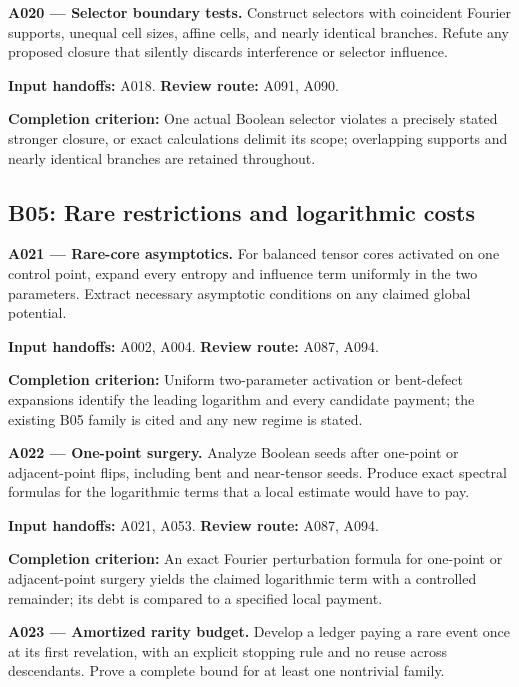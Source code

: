 \documentclass[11pt]{article}
\begin{document}
\textbf{A020 --- Selector boundary tests.} Construct selectors with coincident Fourier supports, unequal cell sizes, affine cells, and nearly identical branches. Refute any proposed closure that silently discards interference or selector influence.

{\small\color{ink}\textbf{Input handoffs:} A018. \textbf{Review route:} A091, A090.\par
\textbf{Completion criterion:} One actual Boolean selector violates a precisely stated stronger closure, or exact calculations delimit its scope; overlapping supports and nearly identical branches are retained throughout.\par}



\subsection{B05: Rare restrictions and logarithmic costs}

\textbf{A021 --- Rare-core asymptotics.} For balanced tensor cores activated on one control point, expand every entropy and influence term uniformly in the two parameters. Extract necessary asymptotic conditions on any claimed global potential.

{\small\color{ink}\textbf{Input handoffs:} A002, A004. \textbf{Review route:} A087, A094.\par
\textbf{Completion criterion:} Uniform two-parameter activation or bent-defect expansions identify the leading logarithm and every candidate payment; the existing B05 family is cited and any new regime is stated.\par}



\textbf{A022 --- One-point surgery.} Analyze Boolean seeds after one-point or adjacent-point flips, including bent and near-tensor seeds. Produce exact spectral formulas for the logarithmic terms that a local estimate would have to pay.

{\small\color{ink}\textbf{Input handoffs:} A021, A053. \textbf{Review route:} A087, A094.\par
\textbf{Completion criterion:} An exact Fourier perturbation formula for one-point or adjacent-point surgery yields the claimed logarithmic term with a controlled remainder; its debt is compared to a specified local payment.\par}



\textbf{A023 --- Amortized rarity budget.} Develop a ledger paying a rare event once at its first revelation, with an explicit stopping rule and no reuse across descendants. Prove a complete bound for at least one nontrivial family.
\end{document}
